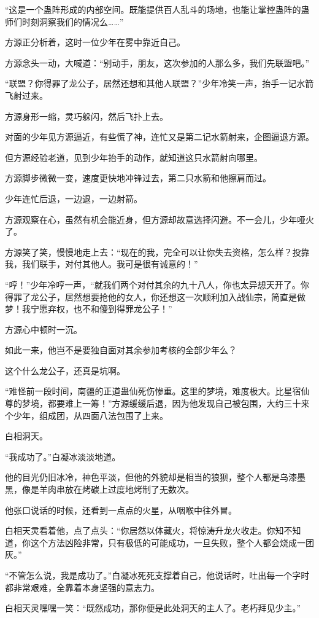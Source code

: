 \begin{this_body}
“这是一个蛊阵形成的内部空间。既能提供百人乱斗的场地，也能让掌控蛊阵的蛊师们时刻洞察我们的情况么……”

方源正分析着，这时一位少年在雾中靠近自己。

方源念头一动，大喊道：“别动手，朋友，这次参加的人那么多，我们先联盟吧。”

“联盟？你得罪了龙公子，居然还想和其他人联盟？”少年冷笑一声，抬手一记水箭飞射过来。

方源身形一缩，灵巧躲闪，然后飞扑上去。

对面的少年见方源逼近，有些慌了神，连忙又是第二记水箭射来，企图逼退方源。

但方源经验老道，见到少年抬手的动作，就知道这只水箭射向哪里。

方源脚步微微一变，速度更快地冲锋过去，第二只水箭和他擦肩而过。

少年连忙后退，一边退，一边射箭。

方源观察在心，虽然有机会能近身，但方源却故意选择闪避。不一会儿，少年哑火了。

方源笑了笑，慢慢地走上去：“现在的我，完全可以让你失去资格，怎么样？投靠我，我们联手，对付其他人。我可是很有诚意的！”

“哼！”少年冷哼一声，“就我们两个对付其余的九十八人，你也太异想天开了。你得罪了龙公子，居然想要抢他的女人，你还想这一次顺利加入战仙宗，简直是做梦！我宁愿弃权，也不和傻到得罪龙公子！”

方源心中顿时一沉。

如此一来，他岂不是要独自面对其余参加考核的全部少年么？

这个什么龙公子，还真是坑啊。

“难怪前一段时间，南疆的正道蛊仙死伤惨重。这里的梦境，难度极大。比星宿仙尊的梦境，都要难上一筹！”方源缓缓后退，因为他发现自己被包围，大约三十来个少年，组成团，从四面八法包围了上来。

白相洞天。

“我成功了。”白凝冰淡淡地道。

他的目光仍旧冰冷，神色平淡，但他的外貌却是相当的狼狈，整个人都是乌漆墨黑，像是羊肉串放在烤碳上过度地烤制了无数次。

他张口说话的时候，还看到一点点的火星，从咽喉中往外冒。

白相天灵看着他，点了点头：“你居然以体藏火，将惊涛升龙火收走。你知不知道，你这个方法凶险非常，只有极低的可能成功，一旦失败，整个人都会烧成一团灰。”

“不管怎么说，我是成功了。”白凝冰死死支撑着自己，他说话时，吐出每一个字时都非常艰难，全靠着本身坚强的意志力。

白相天灵嘿嘿一笑：“既然成功，那你便是此处洞天的主人了。老朽拜见少主。”


\end{this_body}
